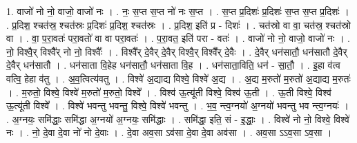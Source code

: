 \documentclass[17pt]{extarticle}
\begin{document}
1. वाजो॑ नो नो॒ वाजो॒ वाजो॑ नः । . नः॒ स॒प्त स॒प्त नो॑ नः स॒प्त । . स॒प्त प्र॒दिशः॑ प्र॒दिशः॑ स॒प्त स॒प्त प्र॒दिशः॑ । . प्र॒दिश॒ श्चत॑स्र॒ श्चत॑स्रः प्र॒दिशः॑ प्र॒दिश॒ श्चत॑स्रः । . प्र॒दिश॒ इति॑ प्र - दिशः॑ । . चत॑स्रो वा वा॒ चत॑स्र॒ श्चत॑स्रो वा । . वा॒ प॒रा॒वतः॑ परा॒वतो॑ वा वा परा॒वतः॑ । . प॒रा॒वत॒ इति॑ परा - वतः॑ । . वाजो॑ नो नो॒ वाजो॒ वाजो॑ नः । . नो॒ विश्वै॒र् विश्वै᳚र् नो नो॒ विश्वैः᳚ । . विश्वै᳚र् दे॒वैर् दे॒वैर् विश्वै॒र् विश्वै᳚र् दे॒वैः । . दे॒वैर् धन॑सातौ॒ धन॑सातौ दे॒वैर् दे॒वैर् धन॑सातौ । . धन॑साता वि॒हेह धन॑सातौ॒ धन॑साता वि॒ह । . धन॑साता॒विति॒ धन॑ - सा॒तौ॒ । . इ॒हा व॑त्व वत्वि॒ हेहा व॑तु । . अ॒व॒त्वित्य॑वतु । . विश्वे॑ अ॒द्याद्य विश्वे॒ विश्वे॑ अ॒द्य । . अ॒द्य म॒रुतो॑ म॒रुतो॑ अ॒द्याद्य म॒रुतः॑ । . म॒रुतो॒ विश्वे॒ विश्वे॑ म॒रुतो॑ म॒रुतो॒ विश्वे᳚ । . विश्व॑ ऊ॒त्यू॑ती विश्वे॒ विश्व॑ ऊ॒ती । . ऊ॒ती विश्वे॒ विश्व॑ ऊ॒त्यू॑ती विश्वे᳚ । . विश्वे॑ भवन्तु भवन्तु॒ विश्वे॒ विश्वे॑ भवन्तु । . भ॒व॒ न्त्व॒ग्नयो॑ अ॒ग्नयो॑ भवन्तु भव न्त्व॒ग्नयः॑ । . अ॒ग्नयः॒ समि॑द्धाः॒ समि॑द्धा अ॒ग्नयो॑ अ॒ग्नयः॒ समि॑द्धाः । . समि॑द्धा॒ इति॒ सं - इ॒द्धाः॒ । . विश्वे॑ नो नो॒ विश्वे॒ विश्वे॑ नः । . नो॒ दे॒वा दे॒वा नो॑ नो दे॒वाः । . दे॒वा अव॒सा ऽव॑सा दे॒वा दे॒वा अव॑सा । . अव॒सा ऽऽव॒सा ऽव॒सा । \newline
\end{document}
